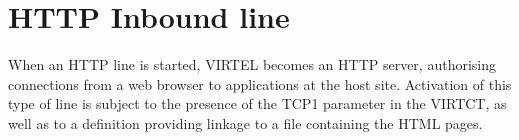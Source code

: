 \documentclass[letterpaper,10pt,english]{sphinxmanual}
\begin{document}

\newpage


\section{HTTP Inbound line}
\label{\detokenize{connectivity_guide:http-inbound-line}}\label{\detokenize{connectivity_guide:index-10}}
When an HTTP line is started, VIRTEL becomes an HTTP server, authorising connections from a web browser to applications at the host site. Activation of this type of line is subject to the presence of the TCP1 parameter in the VIRTCT, as well as to a definition providing linkage to a file containing the HTML pages.

\end{document}
